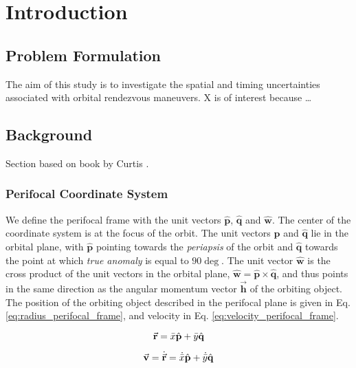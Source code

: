 \section{Introduction}

\subsection{Problem Formulation}

The aim of this study is to investigate the spatial and timing uncertainties associated with orbital rendezvous maneuvers. X is of interest because … 


\subsection{Background}

Section based on book by Curtis \cite{Curtis2009}.


\subsubsection{Perifocal Coordinate System}

We define the perifocal frame with the unit vectors $\hat{\mathbf{p}}$, $\hat{\mathbf{q}}$ and $\hat{\mathbf{w}}$. The center of the coordinate system is at the focus of the orbit. The unit vectors $\hat{\mathbf{p}}$ and $\hat{\mathbf{q}}$ lie in the orbital plane, with $\hat{\mathbf{p}}$ pointing towards the \textit{periapsis} of the orbit and $\hat{\mathbf{q}}$ towards the point at which \textit{true anomaly} is equal to $90 \deg$. The unit vector $\hat{\mathbf{w}}$ is the cross product of the unit vectors in the orbital plane, $\hat{\mathbf{w}} = \hat{\mathbf{p}} \times \hat{\mathbf{q}}$, and thus points in the same direction as the angular momentum vector $\Vec{\mathbf{h}}$ of the orbiting object. \\

The position of the orbiting object described in the perifocal plane is given in Eq. \ref{eq:radius_perifocal_frame}, and velocity in Eq. \ref{eq:velocity_perifocal_frame}.

\begin{equation}
    \Vec{\mathbf{r}} = \Bar{x}\hat{\mathbf{p}} + \Bar{y}\hat{\mathbf{q}}
    \label{eq:radius_perifocal_frame}
\end{equation}

\begin{equation}
    \Vec{\mathbf{v}} = \dot{\Vec{\mathbf{r}}} = \dot{\Bar{x}}\hat{\mathbf{p}} + \dot{\Bar{y}}\hat{\mathbf{q}}
    \label{eq:velocity_perifocal_frame}
\end{equation}




